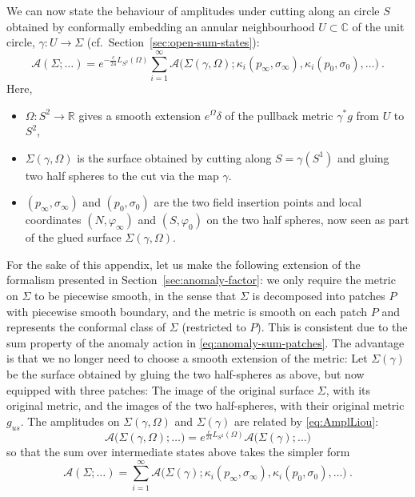\documentclass[11pt,a4paper]{article}
\numberwithin{equation}{section}
\begin{document}
We can now state the behaviour of amplitudes under cutting along an circle $S$ obtained by conformally embedding an annular neighbourhood $U \subset \mathbb{C}$ of the unit circle, $\gamma : U \to \Sigma$ (cf.\ Section~\ref{sec:open-sum-states}):
\begin{equation}
     \mathcal{A}(\Sigma;\dots) 
     =
     e^{-\frac{c}{24}L_{S^2}(\Omega)} 
     \sum_{i=1}^\infty \mathcal{A}\big(\Sigma(\gamma,\Omega); \kappa_i(p_\infty,\sigma_\infty), \kappa_i(p_0,\sigma_0) , \dots \big) \ .
\end{equation}
Here, 
\begin{itemize}
    \item $\Omega : S^2 \to \mathbb{R}$ gives a smooth extension $e^{\Omega}\delta$ of the pullback metric $\gamma^*g$ from $U$ to $S^2$, 
\item $\Sigma(\gamma,\Omega)$ is the surface obtained by cutting along $S = \gamma(S^1)$ and gluing two half spheres to the cut via the map $\gamma$. 
\item $(p_\infty,\sigma_\infty)$ and $(p_0,\sigma_0)$ are the two field insertion points and local coordinates $(N,\varphi_\infty)$ and $(S,\varphi_0)$ on the two half spheres, now seen as part of the glued surface $\Sigma(\gamma,\Omega)$.
\end{itemize}

\smallskip
For the sake of this appendix, let us make the following extension of the formalism presented in Section~\ref{sec:anomaly-factor}: we only require the metric on $\Sigma$ to be piecewise smooth, in the sense that $\Sigma$ is decomposed into patches $P$ with piecewise smooth boundary, and the metric is smooth on each patch $P$ and represents the conformal class of $\Sigma$ (restricted to $P$). This is consistent due to the sum property of the anomaly action in \eqref{eq:anomaly-sum-patches}. 
The advantage is that we no longer need to choose a smooth extension of the metric: Let $\Sigma(\gamma)$ be the surface obtained by gluing the two half-spheres as above, but now equipped with three patches: The image of the original surface $\Sigma$, with its original metric, and the images of the two half-spheres, with their original metric $g_{us}$. The amplitudes on $\Sigma(\gamma,\Omega)$ and $\Sigma(\gamma)$ are related by \eqref{eq:AmplLiou}:
\begin{equation}
    \mathcal{A}\big(\Sigma(\gamma,\Omega); \dots \big) 
=
    e^{\frac{c}{24}L_{S^2}(\Omega)} 
    \mathcal{A}\big(\Sigma(\gamma); \dots \big)
\end{equation}
so that 
the sum over intermediate states above takes the simpler form
\begin{equation}
     \mathcal{A}(\Sigma;\dots) 
     =
     \sum_{i=1}^\infty \mathcal{A}\big(\Sigma(\gamma); \kappa_i(p_\infty,\sigma_\infty), \kappa_i(p_0,\sigma_0) , \dots \big) \ .
\end{equation}
\end{document}
